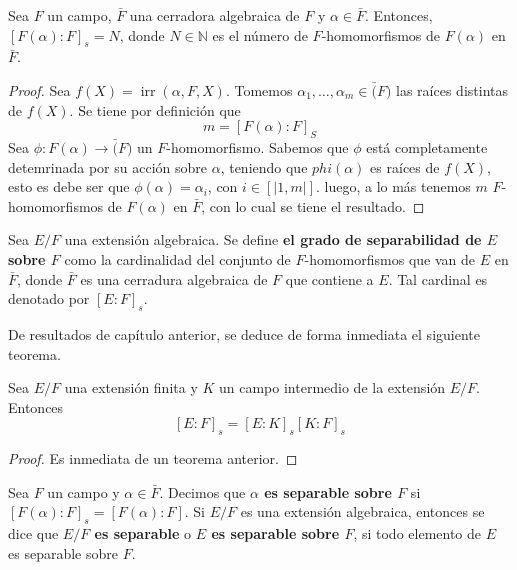 \documentclass[12pt]{report}
\newcommand{\cf}[3]{\ensuremath{#1:#2\rightarrow#3}}
\newcommand{\natint}[1]{\ensuremath{\left[\big|#1\big|\right]}}
\theoremstyle{largebreak}
\DeclareMathOperator{\irr}{irr}
\begin{document}
    \begin{propo}
        Sea $F$ un campo, $\bar{F}$ una cerradora algebraica de $F$ y $\alpha\in\bar{F}$. Entonces, $\left[F(\alpha):F\right]_s=N$, donde $N\in\mathbb{N}$ es el número de $F$-homomorfismos de $F(\alpha)$ en $\bar{F}$.
    \end{propo}
    
    \begin{proof}
        Sea $f(X)=\irr(\alpha,F, X)$. Tomemos $\alpha_1,\dots,\alpha_m\in \bar(F)$ las raíces distintas de $f(X)$. Se tiene por definición que
        \begin{equation*}
            m=\left[F(\alpha):F\right]_{S}
        \end{equation*}
        Sea $\cf{\phi}{F(\alpha)}{\bar(F)}$ un $F$-homomorfismo. Sabemos que $\phi$ está completamente detemrinada por su acción sobre $\alpha$, teniendo que $phi(\alpha)$ es raíces de $f(X)$, esto es debe ser que $\phi(\alpha)=\alpha_{i}$, con $i\in\natint{1,m}$. luego, a lo más tenemos $m$ $F$-homomorfismos de $F(\alpha)$ en $\bar{F}$, con lo cual se tiene el resultado.
    \end{proof}

    \begin{mydef}
        Sea $E/F$ una extensión algebraica. Se define \textbf{el grado de separabilidad de $E$ sobre $F$} como la cardinalidad del conjunto de $F$-homomorfismos que van de $E$ en $\bar{F}$, donde $\bar{F}$ es una cerradura algebraica de $F$ que contiene a $E$. Tal cardinal es denotado por $\left[E:F\right]_s$.
    \end{mydef}

    De resultados de capítulo anterior, se deduce de forma inmediata el siguiente teorema.

    \begin{theor}
        Sea $E/F$ una extensión finita y $K$ un campo intermedio de la extensión $E/F$. Entonces
        \begin{equation}
            \left[E:F\right]_s=\left[E:K\right]_s \left[K:F\right]_s
        \end{equation}
    \end{theor}

    \begin{proof}
        Es inmediata de un teorema anterior.
    \end{proof}

    \begin{mydef}
        Sea $F$ un campo y $\alpha\in\bar{F}$. Decimos que \textbf{$\alpha$ es separable sobre $F$} si $\left[F(\alpha):F\right]_s=\left[F(\alpha):F\right]$. Si $E/F$ es una extensión algebraica, entonces se dice que \textbf{$E/F$ es separable} o \textbf{$E$ es separable sobre $F$}, si todo elemento de $E$ es separable sobre $F$.
    \end{mydef}
\end{document}
